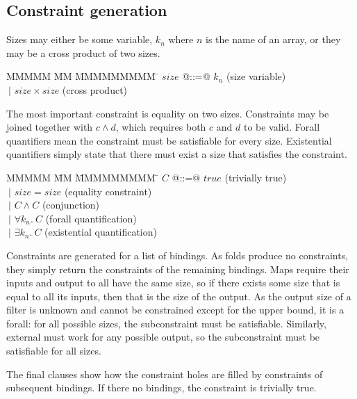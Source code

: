 \newcommand{\constr}[1]{\llbracket #1 \rrbracket}


\subsection{Constraint generation}
Sizes may either be some variable, $k_n$ where $n$ is the name of an array, or they may be a cross product of two sizes.
\begin{tabbing}
MMMMM   \= MM \= MMMMMMMMM \= \kill
$size$  \> @::=@ \> $k_n$               \> (size variable) \\
        \> $~|$  \> $size \times size$  \> (cross product)
\end{tabbing}

The most important constraint is equality on two sizes.
Constraints may be joined together with $c \wedge d$, which requires both $c$ and $d$ to be valid.
Forall quantifiers mean the constraint must be satisfiable for every size.
Existential quantifiers simply state that there must exist a size that satisfies the constraint.
\begin{tabbing}
MMMMM   \= MM \= MMMMMMMMM \= \kill
$C$     \> @::=@ \> $true$              \> (trivially true)             \\
        \> $~|$  \> $size = size$       \> (equality constraint)        \\
        \> $~|$  \> $C \wedge C$        \> (conjunction)                \\
        \> $~|$  \> $\forall k_n.\ C$   \> (forall quantification)      \\
        \> $~|$  \> $\exists k_n.\ C$   \> (existential quantification)
\end{tabbing}

Constraints are generated for a list of bindings.
As folds produce no constraints, they simply return the constraints of the remaining bindings.
Maps require their inputs and output to all have the same size, so if there exists some size that is equal to all its inputs, then that is the size of the output.
As the output size of a filter is unknown and cannot be constrained except for the upper bound, it is a forall: for all possible sizes, the subconstraint must be satisfiable.
Similarly, external must work for any possible output, so the subconstraint must be satisfiable for all sizes.

The final clauses show how the constraint holes are filled by constraints of subsequent bindings. If there no bindings, the constraint is trivially true.

